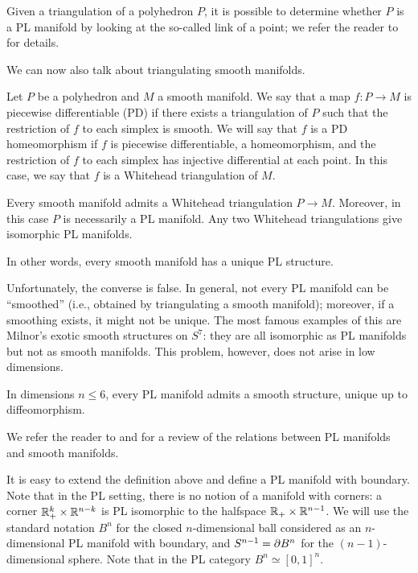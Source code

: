 Given a triangulation of a polyhedron $P$, it is possible to determine whether
$P$ is a PL manifold by looking at the so-called link of a point; we refer the
reader to \cite{rourke} for details.

We can now also talk about triangulating smooth manifolds.

\begin{definition}\label{d:whitehead-triangulation}
Let $P$ be a polyhedron and $M$ a smooth manifold. We say that a map $f\colon
P\to M$ is piecewise differentiable (PD) if there exists a triangulation of $P$
such that the restriction of $f$ to each simplex is smooth. We will say that $f$
is a PD homeomorphism if $f$ is piecewise differentiable, a homeomorphism, and
the restriction of $f$ to each simplex has injective differential at each point.
In this case, we say that $f$ is a Whitehead triangulation of $M$.
\end{definition}

\begin{theorem}\label{t:whitehead}
  Every smooth manifold admits a Whitehead triangulation $P \to M$. Moreover, in
  this case $P$ is necessarily a PL manifold. Any two Whitehead triangulations
  give isomorphic PL manifolds.
\end{theorem}

In other words, every smooth manifold has a unique PL structure.

Unfortunately, the converse is false. In general, not every PL manifold can be
``smoothed'' (i.e., obtained by triangulating a smooth manifold); moreover, if
a smoothing exists, it might not be unique. The most famous examples of this are
Milnor's exotic smooth structures on $S^7$: they are all isomorphic as PL
manifolds but not as smooth manifolds. This problem,
however, does not arise in low dimensions.

\begin{theorem}\label{t:PL-smooth}
    In dimensions $n\le 6$, every PL manifold admits a smooth structure,
    unique up to diffeomorphism.
\end{theorem}
We refer the reader to \cite{milnor-review} and \cite[Lecture 23]{lurie-PL}
for a review of the relations between PL manifolds and smooth manifolds.



It is easy to extend the definition above and define a PL manifold with
boundary. Note that in the PL setting, there is no notion of a manifold with
corners: a corner $\mathbb{R}_+^k \times \mathbb{R}^{n-k}$ is PL isomorphic to the halfspace
$\mathbb{R}_+\times \mathbb{R}^{n-1}$. We will use the standard notation $B^n$ for the closed
$n$-dimensional ball considered as an $n$-dimensional PL manifold with boundary,
and $S^{n-1}=\partial B^n$ for the $(n-1)$-dimensional sphere. Note that in the PL
category $B^n\simeq [0,1]^n$.

